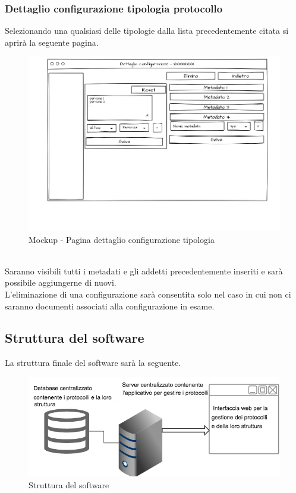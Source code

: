 \subsubsection{Dettaglio configurazione tipologia protocollo}
Selezionando una qualsiasi delle tipologie dalla lista precedentemente citata si aprirà la seguente pagina.
\begin{figure}[!h] 
    \centering 
    \includegraphics[width=1\columnwidth]{immagini/mockup/dettaglioconfig.png}
    \caption{Mockup - Pagina dettaglio configurazione tipologia}
\end{figure}
\\
Saranno visibili tutti i metadati e gli addetti precedentemente inseriti e sarà possibile aggiungerne di nuovi.\\
L'eliminazione di una configurazione sarà consentita solo nel caso in cui non ci saranno documenti associati alla configurazione in esame.
\newpage
\subsection{Struttura del software}
La struttura finale del software sarà la seguente.

\begin{figure}[!h] 
    \centering 
    \includegraphics[width=1\columnwidth]{immagini/prodottofinito/strutturasoftware.png}
    \caption{Struttura del software}
\end{figure}

